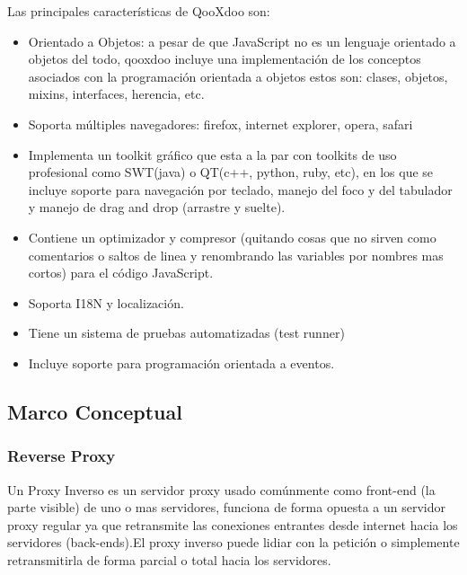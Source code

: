 Las principales características de QooXdoo son:

\begin{itemize}

	\item Orientado a Objetos: a pesar de que JavaScript no es un lenguaje orientado a objetos del todo, qooxdoo incluye una implementación de los conceptos asociados con la programación orientada a objetos estos son: clases, objetos, mixins, interfaces, herencia, etc.
	
	\item Soporta múltiples navegadores: firefox, internet explorer, opera, safari
	
	\item Implementa un toolkit gráfico que esta a la par con toolkits de uso profesional como SWT(java) o QT(c++, python, ruby, etc), en los que se incluye soporte para navegación por teclado, manejo del foco y del tabulador y manejo de drag and drop (arrastre y suelte).
	
	\item Contiene un optimizador y compresor (quitando cosas que no sirven como comentarios o saltos de linea y renombrando las variables por nombres mas cortos) para el código JavaScript.
	
	\item Soporta I18N y localización.
	
	\item Tiene un sistema de pruebas automatizadas (test runner)
	
	\item Incluye soporte para programación orientada a eventos.

\end{itemize}


\subsection{Marco Conceptual}

\subsubsection*{Reverse Proxy}

Un Proxy Inverso es un servidor proxy usado comúnmente como front-end (la parte visible) de uno o mas servidores, funciona de forma opuesta a un servidor proxy regular ya que retransmite las conexiones entrantes desde internet hacia los servidores (back-ends).\newline El proxy inverso puede lidiar con la petición o simplemente retransmitirla de forma parcial o total hacia los servidores.

